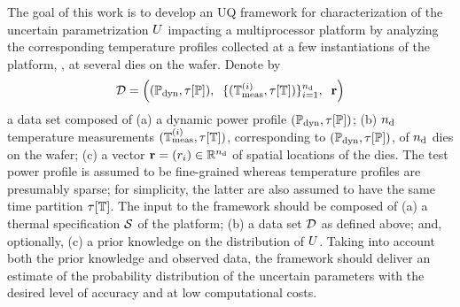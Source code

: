 The goal of this work is to develop an UQ framework for characterization of the uncertain parametrization $U$ impacting a multiprocessor platform by analyzing the corresponding temperature profiles collected at a few instantiations of the platform, \eg, at several dies on the wafer. Denote by
\[
  \mathcal{D} = \left( (\mathbb{P}_{\text{dyn}}, \tau[\mathbb{P}]), \; \; \{ (\mathbb{T}^{(i)}_{\text{meas}}, \tau[\mathbb{T}]) \}_{i = 1}^{{n_\text{d}}}, \; \; \mathbf{r} \right)
\]
a data set composed of (a) a dynamic power profile $(\mathbb{P}_{\text{dyn}}, \tau[\mathbb{P}])$; (b) ${n_\text{d}}$ temperature measurements $(\mathbb{T}^{(i)}_{\text{meas}}, \tau[\mathbb{T}])$, corresponding to $(\mathbb{P}_{\text{dyn}}, \tau[\mathbb{P}])$, of ${n_\text{d}}$ dies on the wafer; (c) a vector $\mathbf{r} = (r_i) \in \mathbb{R}^{n_\text{d}}$ of spatial locations of the dies. The test power profile is assumed to be fine-grained whereas temperature profiles are presumably sparse; for simplicity, the latter are also assumed to have the same time partition $\tau[\mathbb{T}]$. The input to the framework should be composed of (a) a thermal specification $\mathcal{S}$ of the platform; (b) a data set $\mathcal{D}$ as defined above; and, optionally, (c) a prior knowledge on the distribution of $U$. Taking into account both the prior knowledge and observed data, the framework should deliver an estimate of the probability distribution of the uncertain parameters with the desired level of accuracy and at low computational costs.
